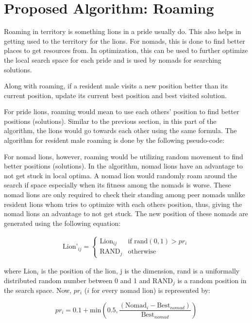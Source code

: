 \section{Proposed Algorithm: Roaming}
Roaming in territory is something lions in a pride usually do. This also helps in getting used to the territory for the lions. For nomads, this is done to find better places to get resources from. In optimization, this can be used to further optimize the local search space for each pride and is used by nomads for searching solutions.

Along with roaming, if a resident male visits a new position better than its current position, update its current best position and best visited solution.

For pride lions, roaming would mean to use each others' position to find better positions (solutions). Similar to the previous section, in this part of the algorithm, the lions would go towards each other using the same formula. The algorithm for resident male roaming is done by the following pseudo-code:



For nomad lions, however, roaming would be utilizing random movement to find better positions (solutions). In the algorithm, nomad lions have an advantage to not get stuck in local optima. A nomad lion would randomly roam around the search if space especially when its fitness among the nomads is worse. These nomad lions are only required to check their standing among peer nomads unlike resident lions whom tries to optimize with each others position, thus, giving the nomad lions an advantage to not get stuck. The new position of these nomads are generated using the following equation:

\begin{align*}
 \text{Lion'}_{ij} =
  \begin{cases}
   \text{Lion}_{ij}        & \text{if rand}(0,1)  > pr_i \\
   \text{RAND}_j        & \text{otherwise}
 \end{cases}
\end{align*}

where Lion$_{i}$ is the position of the lion, j is the dimension, rand is a uniformally distributed random number between 0 and 1 and RAND$_j$ is a random position in the search space. Now, $pr_i$ ($i$ for every nomad lion) is represented by:

$$
pr_i = 0.1 + \text{min}\left(0.5, \frac{ (\text{Nomad}_i - \text{Best}_{nomad}) }{ \text{Best}_{nomad} }\right)
$$

